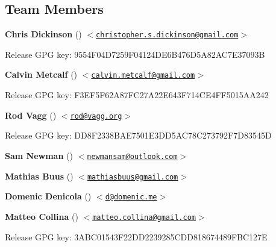 \label{_members}%
 \subsection*{Team Members}


\begin{DoxyItemize}
\item {\bfseries Chris Dickinson} (\href{https://github.com/chrisdickinson}{\tt }) $<$\href{mailto:christopher.s.dickinson@gmail.com}{\tt christopher.\+s.\+dickinson@gmail.\+com}$>$
\begin{DoxyItemize}
\item Release G\+PG key\+: 9554\+F04\+D7259\+F04124\+D\+E6\+B476\+D5\+A82\+A\+C7\+E37093B
\end{DoxyItemize}
\item {\bfseries Calvin Metcalf} (\href{https://github.com/calvinmetcalf}{\tt }) $<$\href{mailto:calvin.metcalf@gmail.com}{\tt calvin.\+metcalf@gmail.\+com}$>$
\begin{DoxyItemize}
\item Release G\+PG key\+: F3\+E\+F5\+F62\+A87\+F\+C27\+A22\+E643\+F714\+C\+E4\+F\+F5015\+A\+A242
\end{DoxyItemize}
\item {\bfseries Rod Vagg} (\href{https://github.com/rvagg}{\tt }) $<$\href{mailto:rod@vagg.org}{\tt rod@vagg.\+org}$>$
\begin{DoxyItemize}
\item Release G\+PG key\+: D\+D8\+F2338\+B\+A\+E7501\+E3\+D\+D5\+A\+C78\+C273792\+F7\+D83545D
\end{DoxyItemize}
\item {\bfseries Sam Newman} (\href{https://github.com/sonewman}{\tt }) $<$\href{mailto:newmansam@outlook.com}{\tt newmansam@outlook.\+com}$>$
\item {\bfseries Mathias Buus} (\href{https://github.com/mafintosh}{\tt }) $<$\href{mailto:mathiasbuus@gmail.com}{\tt mathiasbuus@gmail.\+com}$>$
\item {\bfseries Domenic Denicola} (\href{https://github.com/domenic}{\tt }) $<$\href{mailto:d@domenic.me}{\tt d@domenic.\+me}$>$
\item {\bfseries Matteo Collina} (\href{https://github.com/mcollina}{\tt }) $<$\href{mailto:matteo.collina@gmail.com}{\tt matteo.\+collina@gmail.\+com}$>$
\begin{DoxyItemize}
\item Release G\+PG key\+: 3\+A\+B\+C01543\+F22\+D\+D2239285\+C\+D\+D818674489\+F\+B\+C127E 
\end{DoxyItemize}
\end{DoxyItemize}